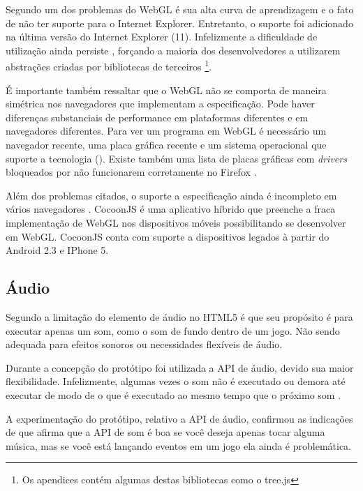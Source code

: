 Segundo \citet{html5mostwanted} um dos problemas do WebGL é sua alta
curva de aprendizagem e o fato de não ter suporte para o Internet
Explorer. Entretanto, o suporte foi adicionado na última versão do
Internet Explorer (11). Infelizmente a dificuldade de utilização
ainda persiste , forçando a maioria dos
desenvolvedores a utilizarem abstrações criadas por bibliotecas de
terceiros \footnote{Os apendices contém algumas destas bibliotecas como
o tree.js}.

É importante também ressaltar que o WebGL não se comporta de
maneira simétrica nos navegadores que implementam a especificação.
Pode haver diferenças substanciais de performance em plataformas
diferentes e em navegadores diferentes. Para ver um programa em WebGL
é necessário um navegador recente, uma placa gráfica recente e um
sistema operacional que suporte a tecnologia \autocite{html5mostwanted}
(). Existe também uma lista de
placas gráficas com \textit{drivers} bloqueados por não funcionarem
corretamente no Firefox \autocite[p.42]{3daps}.

Além dos problemas citados, o suporte a especificação ainda é
incompleto em vários navegadores .
CocoonJS é uma aplicativo híbrido que preenche a fraca implementação
de WebGL nos dispositivos móveis possibilitando se desenvolver em
WebGL. CocoonJS conta com suporte a dispositivos legados à partir do
Android 2.3 e IPhone 5.

\subsection{Áudio}

Segundo \citet{html5mostwanted} a limitação do elemento de áudio no
HTML5 é que seu propósito é para executar apenas um som, como o som
de fundo dentro de um jogo. Não sendo adequada para efeitos sonoros
ou necessidades flexíveis de áudio.

Durante a concepção do protótipo foi utilizada a API de áudio, devido
sua maior flexibilidade. Infelizmente, algumas vezes o som não é
executado ou demora até executar de modo de o que é executado ao mesmo
tempo que o próximo som .

A experimentação do protótipo, relativo a API de áudio, confirmou
as indicações de \citet{html5mostwanted} que afirma que a API de som
é boa se você deseja apenas tocar alguma música, mas se você está
lançando eventos em um jogo ela ainda é problemática.

